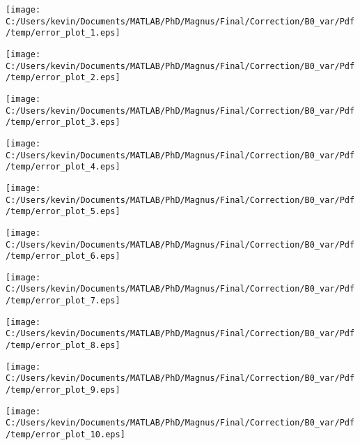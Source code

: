 \begin{landscape}
\texttt{[image: C:/Users/kevin/Documents/MATLAB/PhD/Magnus/Final/Correction/B0\_var/Pdf/temp/error\_plot\_1.eps]}
\end{landscape}
\begin{landscape}
\texttt{[image: C:/Users/kevin/Documents/MATLAB/PhD/Magnus/Final/Correction/B0\_var/Pdf/temp/error\_plot\_2.eps]}
\end{landscape}
\begin{landscape}
\texttt{[image: C:/Users/kevin/Documents/MATLAB/PhD/Magnus/Final/Correction/B0\_var/Pdf/temp/error\_plot\_3.eps]}
\end{landscape}
\begin{landscape}
\texttt{[image: C:/Users/kevin/Documents/MATLAB/PhD/Magnus/Final/Correction/B0\_var/Pdf/temp/error\_plot\_4.eps]}
\end{landscape}
\begin{landscape}
\texttt{[image: C:/Users/kevin/Documents/MATLAB/PhD/Magnus/Final/Correction/B0\_var/Pdf/temp/error\_plot\_5.eps]}
\end{landscape}
\begin{landscape}
\texttt{[image: C:/Users/kevin/Documents/MATLAB/PhD/Magnus/Final/Correction/B0\_var/Pdf/temp/error\_plot\_6.eps]}
\end{landscape}
\begin{landscape}
\texttt{[image: C:/Users/kevin/Documents/MATLAB/PhD/Magnus/Final/Correction/B0\_var/Pdf/temp/error\_plot\_7.eps]}
\end{landscape}
\begin{landscape}
\texttt{[image: C:/Users/kevin/Documents/MATLAB/PhD/Magnus/Final/Correction/B0\_var/Pdf/temp/error\_plot\_8.eps]}
\end{landscape}
\begin{landscape}
\texttt{[image: C:/Users/kevin/Documents/MATLAB/PhD/Magnus/Final/Correction/B0\_var/Pdf/temp/error\_plot\_9.eps]}
\end{landscape}
\begin{landscape}
\texttt{[image: C:/Users/kevin/Documents/MATLAB/PhD/Magnus/Final/Correction/B0\_var/Pdf/temp/error\_plot\_10.eps]}
\end{landscape}
